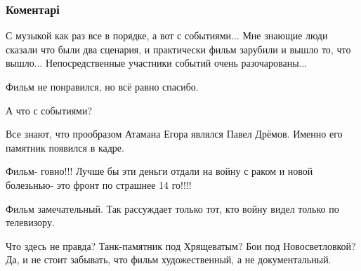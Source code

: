  
 
 
 
 
\subsubsection{Коментарі}
\label{sec:17_11_2021.fb.razum_roman.1.opolchenochka.cmt}

\begin{itemize} %
С музыкой как раз все в порядке, а вот с событиями... Мне знающие люди сказали что были два сценария, и практически фильм зарубили и вышло то, что вышло... Непосредственные участники событий очень разочарованы...

Фильм не понравился, но всё равно спасибо.

А что с событиями?

Все знают, что прообразом Атамана Егора являлся Павел Дрёмов. Именно его памятник появился в кадре.

Фильм- говно!!! Лучше бы эти деньги отдали на войну с раком и новой болезьнью- это фронт по страшнее 14 го!!!!

Фильм замечательный. Так рассуждает только тот, кто войну видел только по телевизору.

Что здесь не правда? Танк-памятник под Хрящеватым? Бои под Новосветловкой? Да, и не стоит забывать, что фильм художественный, а не документальный.
\end{itemize} %
